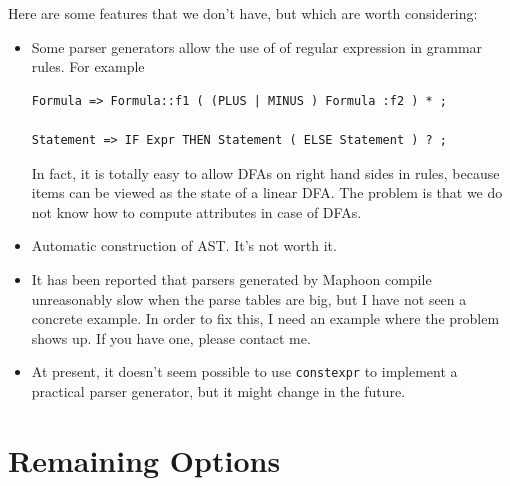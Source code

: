\documentclass{article}
\begin{document}
Here are some features that we don't have, but which
are worth considering:
\begin{itemize}
\item
Some parser generators allow the use of of regular expression in grammar rules.
For example 
\begin{verbatim}
Formula => Formula::f1 ( (PLUS | MINUS ) Formula :f2 ) * ; 

Statement => IF Expr THEN Statement ( ELSE Statement ) ? ; \end{verbatim}
In fact, it is totally easy to allow DFAs on right hand sides in rules,
because items can be viewed as the state of a linear DFA. 
The problem is that we do not know how to compute attributes
in case of DFAs. 

\item
   Automatic construction of AST. It's not worth it. 

\item
   It has been reported that parsers generated by Maphoon compile
   unreasonably slow when the parse tables are big, but I have
   not seen a concrete example. In order to fix
   this, I need an example where the problem shows up. 
   If you have one, please contact me.
\item
   At present, it doesn't seem possible to use \verb|constexpr| to
   implement a practical parser generator, but it might change in the 
   future.
     
\end{itemize}


\section{Remaining Options}
\label{Sect_remaining}
\end{document}
